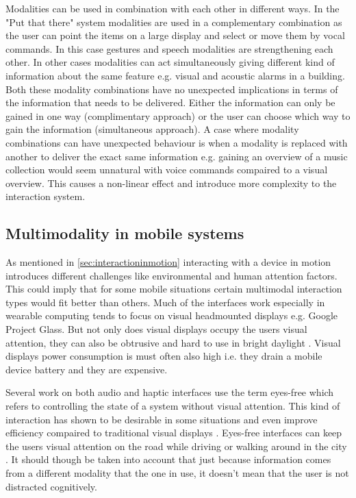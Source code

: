 Modalities can be used in combination with each other in different ways. In the "Put that there" system \cite{bolt_put-that-there:_1980} modalities are used in a complementary combination as the user can point the items on a large display and select or move them by vocal commands. In this case gestures and speech modalities are strengthening each other. In other cases modalities can act simultaneously giving different kind of information about the same feature e.g. visual and acoustic alarms in a building. Both these modality combinations have no unexpected implications in terms of the information that needs to be delivered. Either the information can only be gained in one way (complimentary approach) or the user can choose which way to gain the information (simultaneous approach). A case where modality combinations can have unexpected behaviour is when a modality is replaced with another to deliver the exact same information e.g. gaining an overview of a music collection would seem unnatural with voice commands compaired to a visual overview. This causes a non-linear effect and introduce more complexity to the interaction system.

\subsection{Multimodality in mobile systems}
As mentioned in \ref{sec:interactioninmotion} interacting with a device in motion introduces different challenges like environmental and human attention factors. This could imply that for some mobile situations certain multimodal interaction types would fit better than others. Much of the interfaces work especially in wearable computing tends to focus on visual headmounted displays \cite{barfield_fundamentals_2000} e.g. Google Project Glass. But not only does visual displays occupy the users visual attention, they can also be obtrusive and hard to use in bright daylight \cite{geelhoed_safety_2000}. Visual displays power consumption is must often also high i.e. they drain a mobile device battery and they are expensive.

Several work on both audio \cite{kajastila_eyes-free_2013,bonner_no-look_2010,brewster_multimodaleyes-freeinteraction_2003,zhao_earpod:_2007,vazquez-alvarez_eyes-free_2011} and haptic \cite{pasquero_haptic_2011,pielot_tactile_2011} interfaces use the term eyes-free which refers to controlling the state of a system without visual attention. This kind of interaction has shown to be desirable in some situations \cite{oakley_designing_2007,yi_exploring_2012} and even improve efficiency compaired to traditional visual displays \cite{zhao_earpod:_2007}. Eyes-free interfaces can keep the users visual attention on the road while driving \cite{sodnik_user_2008} or walking around in the city \cite{vazquez-alvarez_eyes-free_2011}. It should though be taken into account that just because information comes from a different modality that the one in use, it doesn't mean that the user is not distracted cognitively.

